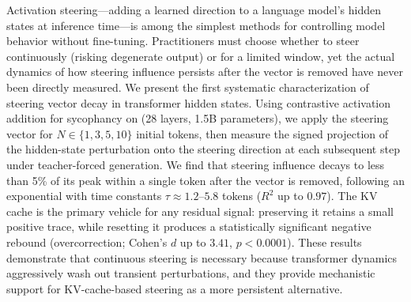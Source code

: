 Activation steering---adding a learned direction to a language model's hidden states at inference time---is among the simplest methods for controlling model behavior without fine-tuning. Practitioners must choose whether to steer continuously (risking degenerate output) or for a limited window, yet the actual dynamics of how steering influence persists after the vector is removed have never been directly measured. We present the first systematic characterization of steering vector decay in transformer hidden states. Using contrastive activation addition for sycophancy on \qwen (28 layers, 1.5B parameters), we apply the steering vector for $N \in \{1, 3, 5, 10\}$ initial tokens, then measure the signed projection of the hidden-state perturbation onto the steering direction at each subsequent step under teacher-forced generation. We find that steering influence decays to less than 5\% of its peak within a single token after the vector is removed, following an exponential with time constants $\tau \approx 1.2$--$5.8$ tokens ($R^2$ up to $0.97$). The KV cache is the primary vehicle for any residual signal: preserving it retains a small positive trace, while resetting it produces a statistically significant negative rebound (overcorrection; Cohen's $d$ up to $3.41$, $p < 0.0001$). These results demonstrate that continuous steering is necessary because transformer dynamics aggressively wash out transient perturbations, and they provide mechanistic support for KV-cache-based steering as a more persistent alternative.
